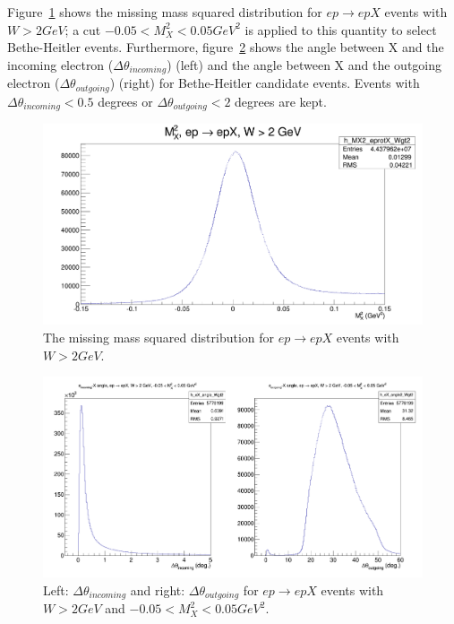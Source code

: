 Figure~\ref{fig:h_MX2_eprotX_Wgt2} shows the missing mass squared distribution for $ep \rightarrow epX$ events with $W > 2 GeV$; a cut $-0.05 < M_X^2 < 0.05 GeV^2$ is applied to this quantity to select Bethe-Heitler events.
Furthermore, figure~\ref{fig:eXangles_eprotX_Wgt2} shows the angle between X and the incoming electron ($\Delta\theta_{incoming}$) (left) and the angle between X and the outgoing electron ($\Delta\theta_{outgoing}$) (right) for Bethe-Heitler candidate events.
Events with $\Delta\theta_{incoming} < 0.5$ degrees or $\Delta\theta_{outgoing} < 2$ degrees are kept.
%
\begin{figure}[htp]
\centering
\includegraphics[width=5in]{figures/h_MX2_eprotX_Wgt2.png}
\caption{The missing mass squared distribution for $ep \rightarrow epX$ events with $W > 2 GeV$.}
\label{fig:h_MX2_eprotX_Wgt2}
\end{figure}
%
\begin{figure}[htp]
\centering
\includegraphics[width=5in]{figures/eXangles_eprotX_Wgt2.png}
\caption{Left: $\Delta\theta_{incoming}$ and right: $\Delta\theta_{outgoing}$ for $ep \rightarrow epX$ events with $W > 2 GeV$ and $-0.05 < M_X^2 < 0.05 GeV^2$.}
\label{fig:eXangles_eprotX_Wgt2}
\end{figure}
%

